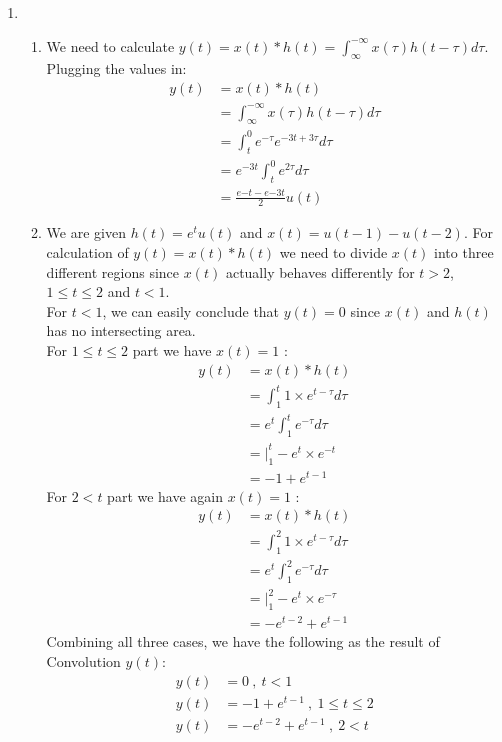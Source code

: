 \documentclass[10pt,a4paper, margin=1in]{article}
\begin{document}
\begin{enumerate}
\item 
    \begin{enumerate}
    \item
    We need to calculate $y(t)=x(t)*h(t)=\int_{\infty}^{-\infty} x(\tau)h(t-\tau)d\tau$. \\
    Plugging the values in:
    \begin{align*}
    y(t)&=x(t)*h(t) \\
    	&=\int_{\infty}^{-\infty} x(\tau)h(t-\tau)d\tau \\
    	&=\int_{t}^{0} e^{-\tau}e^{-3t+3\tau}d\tau \\
    	&=e^{-3t}\int_{t}^{0} e^{2\tau}d\tau \\
    	&=\frac{e{-t}-e{-3t}}{2}u(t)
    \end{align*}
    \item
    We are given $h(t) = e^tu(t)$ and $x(t)=u(t-1)-u(t-2)$. For calculation of $y(t)=x(t)*h(t)$ we need to divide $x(t)$ into three different regions since $x(t)$ actually behaves differently for $t>2$, $1\leq t \leq 2$ and $t<1$. \\
    
    For $t<1$, we can easily conclude that $y(t)=0$ since $x(t)$ and $h(t)$ has no intersecting area. \\
    
    For $1 \leq t \leq 2$ part we have $x(t) = 1$ : 
    \begin{align*}
        y(t) &= x(t)*h(t) \\
        &= \int_1^t 1 \times e^{t - \tau}d\tau \\
        &= e^t \int_1^t e^{-\tau}d\tau \\
        &= |_1^t-e^t \times e^{-t} \\
        &= -1 + e^{t - 1} 
    \end{align*}
    For $2 < t$ part we have again $x(t) = 1$ : 
    \begin{align*}
        y(t) &= x(t)*h(t) \\
        &= \int_1^2 1 \times e^{t - \tau}d\tau \\
        &= e^t \int_1^2 e^{-\tau}d\tau \\
        &= |_1^2-e^t \times e^{-\tau}\\
        &= -e^{t - 2} + e^{t - 1}
    \end{align*}
	Combining all three cases, we have the following as the result of Convolution $y(t)$:
    \begin{align*}
        y(t) &= 0\ ,\ t < 1 \\
        y(t) &= -1 + e^{t - 1}\ ,\ 1 \leq t \leq 2 \\
        y(t) &= -e^{t - 2} + e^{t - 1}\ ,\ 2 < t \\
    \end{align*}
    \end{enumerate}
\newpage


\end{enumerate}
\end{document}
